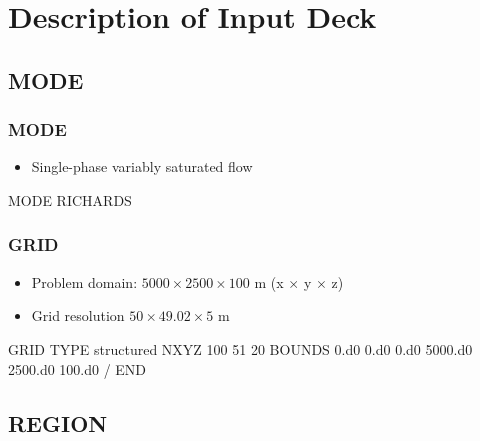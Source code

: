 \documentclass{beamer}
\begin{document}
\section{Description of Input Deck}

\subsection{MODE}
\begin{frame}\frametitle{MODE}

\begin{itemize}
  \item Single-phase variably saturated flow
\end{itemize}

\begin{semiverbatim}

MODE RICHARDS
\end{semiverbatim}

\end{frame}

\begin{frame}\frametitle{GRID}

\begin{itemize}
  \item Problem domain: $5000 \times 2500 \times 100$ m (x $\times$ y $\times$ z)
  \item Grid resolution $50 \times 49.02 \times 5$ m
\end{itemize}

\begin{semiverbatim}
GRID
  TYPE structured
  NXYZ 100 51 20
  BOUNDS
    0.d0 0.d0 0.d0
    5000.d0 2500.d0 100.d0
  /
END
\end{semiverbatim}

\end{frame}

\subsection{REGION}
\end{document}
